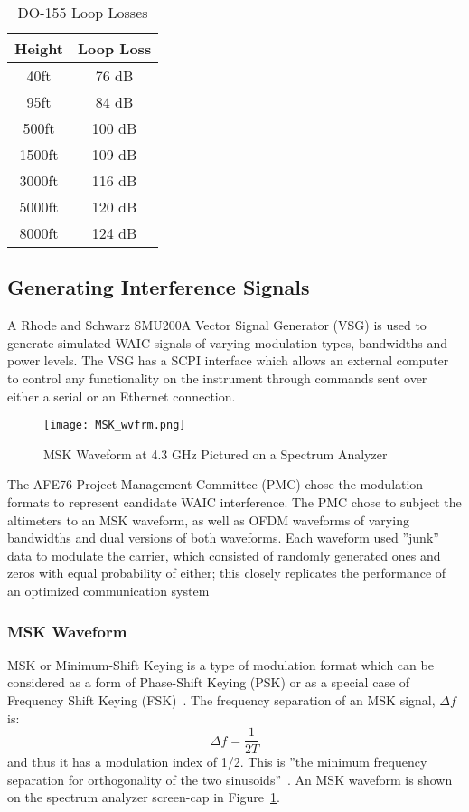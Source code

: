 \begin{table}[]
\centering
\begin{tabular}{|c|c|}
\hline
\textbf{Height} & \textbf{Loop Loss} \\ \hline
40ft            & 76 dB              \\ \hline
95ft            & 84 dB              \\ \hline
500ft           & 100 dB             \\ \hline
1500ft          & 109 dB             \\ \hline
3000ft          & 116 dB             \\ \hline
5000ft          & 120 dB             \\ \hline
8000ft          & 124 dB             \\ \hline
\end{tabular}
\caption{DO-155 Loop Losses}
\label{tab:loop loss}
\end{table}

\subsection{Generating Interference Signals}\label{sub:Generating}
A Rhode and Schwarz SMU200A Vector Signal Generator (VSG) is used to generate simulated WAIC signals of varying modulation types, bandwidths and power levels. The VSG has a SCPI interface which allows an external computer to control any functionality on the instrument through commands sent over either a serial or an Ethernet connection. 
\begin{figure}[ht]
\centering
\texttt{[image: MSK\_wvfrm.png]}
\caption{MSK Waveform at 4.3 GHz Pictured on a Spectrum Analyzer}

\label{fig:MSK}

\end{figure}

The AFE76 Project Management Committee (PMC) chose the modulation formats to represent candidate WAIC interference. The PMC chose to subject the altimeters to an MSK waveform, as well as OFDM waveforms of varying bandwidths and dual versions of both waveforms. Each waveform used ''junk'' data to modulate the carrier, which consisted of randomly generated ones and zeros with equal probability of either; this closely replicates the performance of an optimized communication system~\cite{unknown}
\subsubsection{MSK Waveform}\label{subsub:MSK}
MSK or Minimum-Shift Keying is a type of modulation format which can be considered as a form of Phase-Shift Keying (PSK) or as a special case of Frequency Shift Keying (FSK)~\cite{proakis_communication_2002}. The frequency separation of an MSK signal, $\Delta f$ is: $$ \Delta f = \frac{1}{2T}$$
and thus it has a modulation index of 1/2. This is ''the minimum frequency separation for orthogonality of the two sinusoids''~\cite{proakis_communication_2002}. An MSK waveform is shown on the spectrum analyzer screen-cap in Figure~\ref{fig:MSK}.


